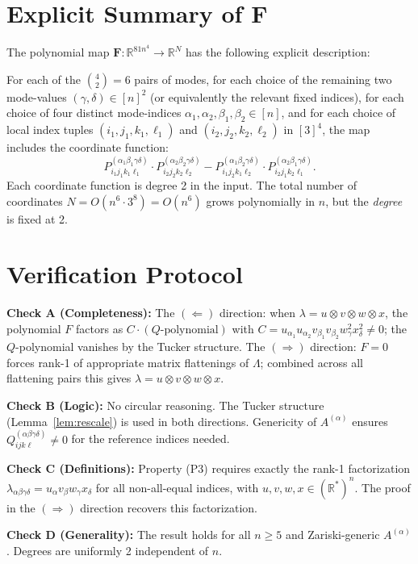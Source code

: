 \documentclass[12pt]{article}
\theoremstyle{definition}
\newcommand{\R}{\mathbb{R}}
\begin{document}
\section{Explicit Summary of $\mathbf{F}$}

The polynomial map $\mathbf{F}: \R^{81n^4} \to \R^N$ has the following explicit description:

For each of the $\binom{4}{2} = 6$ pairs of modes, for each choice of the remaining two mode-values $(\gamma,\delta) \in [n]^2$ (or equivalently the relevant fixed indices), for each choice of four distinct mode-indices $\alpha_1,\alpha_2,\beta_1,\beta_2 \in [n]$, and for each choice of local index tuples $(i_1,j_1,k_1,\ell_1)$ and $(i_2,j_2,k_2,\ell_2)$ in $[3]^4$, the map includes the coordinate function:
\[
P^{(\alpha_1\beta_1\gamma\delta)}_{i_1j_1k_1\ell_1} \cdot P^{(\alpha_2\beta_2\gamma\delta)}_{i_2j_2k_2\ell_2}
- P^{(\alpha_1\beta_2\gamma\delta)}_{i_1j_2k_1\ell_2} \cdot P^{(\alpha_2\beta_1\gamma\delta)}_{i_2j_1k_2\ell_1}.
\]
Each coordinate function is degree 2 in the input. The total number of coordinates $N = O(n^6 \cdot 3^8) = O(n^6)$ grows polynomially in $n$, but the \emph{degree} is fixed at 2.

\section{Verification Protocol}

\textbf{Check A (Completeness):} The $(\Leftarrow)$ direction: when $\lambda = u\otimes v\otimes w\otimes x$, the polynomial $F$ factors as $C \cdot (Q\text{-polynomial})$ with $C = u_{\alpha_1}u_{\alpha_2}v_{\beta_1}v_{\beta_2}w_\gamma^2 x_\delta^2 \neq 0$; the $Q$-polynomial vanishes by the Tucker structure. The $(\Rightarrow)$ direction: $F=0$ forces rank-1 of appropriate matrix flattenings of $\Lambda$; combined across all flattening pairs this gives $\lambda = u\otimes v\otimes w\otimes x$.

\textbf{Check B (Logic):} No circular reasoning. The Tucker structure (Lemma~\ref{lem:rescale}) is used in both directions. Genericity of $A^{(\alpha)}$ ensures $Q^{(\alpha\beta\gamma\delta)}_{ijk\ell} \neq 0$ for the reference indices needed.

\textbf{Check C (Definitions):} Property (P3) requires exactly the rank-1 factorization $\lambda_{\alpha\beta\gamma\delta} = u_\alpha v_\beta w_\gamma x_\delta$ for all non-all-equal indices, with $u,v,w,x \in (\R^*)^n$. The proof in the $(\Rightarrow)$ direction recovers this factorization.

\textbf{Check D (Generality):} The result holds for all $n \geq 5$ and Zariski-generic $A^{(\alpha)}$. Degrees are uniformly 2 independent of $n$.
\end{document}
